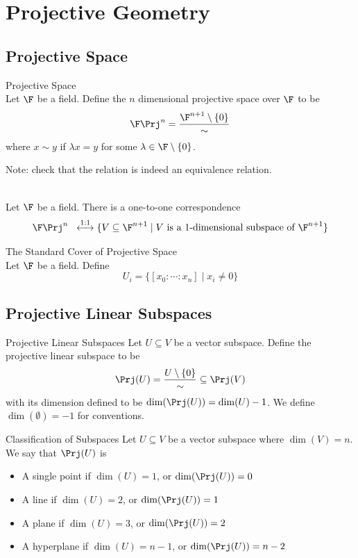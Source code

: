 \documentclass[a4paper]{article}
\begin{document}
\pagebreak
\section{Projective Geometry}
\subsection{Projective Space}
\begin{defn}{Projective Space}{}\\
Let $\F$ be a field. Define the $n$ dimensional projective space over $\F$ to be $$\F\Prj^n=\frac{\F^{n+1}\setminus\{0\}}{\sim}$$ where $x\sim y$ if $\lambda x=y$ for some $\lambda\in\F\setminus\{0\}$. 
\end{defn}

Note: check that the relation is indeed an equivalence relation. 

\begin{prp}{}{}\\
Let $\F$ be a field. There is a one-to-one correspondence $$\F\Prj^n\;\;\overset{1:1}{\longleftrightarrow}\{V\subseteq\F^{n+1}\;|\;V\text{ is a }1\text{-dimensional subspace of }\F^{n+1}\}$$
\end{prp}

\begin{defn}{The Standard Cover of Projective Space}{}\\
Let $\F$ be a field. Define $$U_i=\{[x_0:\cdots:x_n]\;|\;x_i\neq 0\}$$
\end{defn}

\subsection{Projective Linear Subspaces}
\begin{defn}{Projective Linear Subspaces}{} Let $U\subseteq V$ be a vector subspace. Define the projective linear subspace to be $$\Prj(U)=\frac{U\setminus\{0\}}{\sim}\subseteq\Prj(V)$$ with its dimension defined to be $\dim(\Prj(U))=\dim(U)-1$. We define $\dim(\emptyset)=-1$ for conventions. 
\end{defn}

\begin{defn}{Classification of Subspaces}{} Let $U\subseteq V$ be a vector subspace where $\dim(V)=n$. We say that $\Prj(U)$ is
\begin{itemize}
\item A single point if $\dim(U)=1$, or $\dim(\Prj(U))=0$
\item A line if $\dim(U)=2$, or $\dim(\Prj(U))=1$
\item A plane if $\dim(U)=3$, or $\dim(\Prj(U))=2$
\item A hyperplane if $\dim(U)=n-1$, or $\dim(\Prj(U))=n-2$
\end{itemize}
\end{defn}
\end{document}
